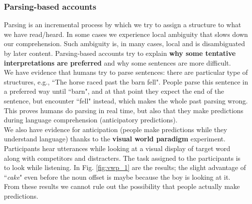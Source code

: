 \subsubsection{Parsing-based accounts}
Parsing is an incremental process by which we try to assign a structure to what we have read/heard. In some cases we experience local ambiguity that slows down our comprehension. Such ambiguity is, in many cases, local and is disambiguated by later content. Parsing-based accounts try to explain \textbf{why some tentative interpretations are preferred} and why some sentences are more difficult.\\

We have evidence that humans try to parse sentences: there are particular type of structures, e.g., ``The horse raced past the barn fell". People parse this sentence in a preferred way until ``barn", and at that point they expect the end of the sentence, but encounter ``fell" instead, which makes the whole past parsing wrong. This proves humans do parsing in real time, but also that they make predictions during language comprehension (anticipatory predictions).\\

We also have evidence for anticipation (people make predictions while they understand language) thanks to the \textbf{visual world paradigm} experiment. Participants hear utterances while looking at a visual display of target word along with competitors and distracters. The task assigned to the participants is to look while listening. In Fig. \ref{fig:vwp_1} are the results; the slight advantage of ``\textit{cake}" even before the noun offset is maybe because the boy is looking at it. From these results we cannot rule out the possibility that people actually make predictions.

